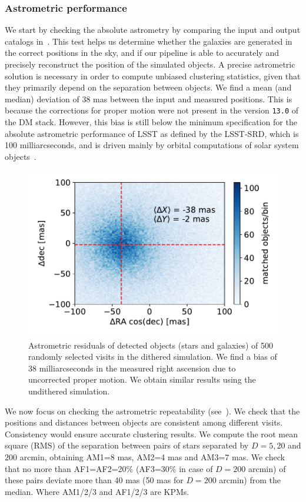 \documentclass[\docopts]{\docclass}
\begin{document}
\subsubsection{Astrometric performance}
\label{sssec:astrometry}
We start by checking the absolute astrometry by comparing the input and output catalogs in~. This test helps us determine whether the galaxies are generated in the correct positions in the sky, and if our pipeline is able to accurately and precisely reconstruct the position of the simulated objects. A precise astrometric solution is necessary in order to compute unbiased clustering statistics, given that they primarily depend on the separation between objects. We find a mean (and median) deviation of 38 mas between the input and measured positions. This is because the corrections for proper motion were not present in the version \texttt{13.0} of the DM stack. However, this bias is still below the minimum specification for the absolute astrometric performance of LSST as defined by the LSST-SRD, which is 100 milliarcseconds, and is driven mainly by orbital computations of solar system objects~\citep{LPM-17}. 

\begin{figure}
\centering
\includegraphics[width=0.9\columnwidth]{astrometric_residuals_single_visit_2d}
\caption{Astrometric residuals of detected objects (stars and galaxies) of 500 randomly selected visits in the dithered simulation. We find a bias of 38 milliarcseconds in the measured right ascension due to uncorrected proper motion. We obtain similar results using the undithered simulation.}
\label{fig:AA1}
\end{figure}

We now focus on checking the astrometric repeatability (see~). We check that the positions and distances between objects are consistent among different visits. Consistency would ensure accurate clustering results. We compute the root mean square (RMS) of the separation between pairs of stars separated by $D=5, 20$ and $200$ arcmin, obtaining AM1=8 mas, AM2=4 mas and AM3=7 mas. We check that no more than AF1=AF2=20\% (AF3=30\% in case of $D=200$ arcmin) of these pairs deviate more than 40 mas (50 mas for $D=200$ arcmin) from the median. Where AM1/2/3 and AF1/2/3 are KPMs.
\end{document}
